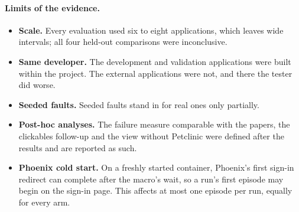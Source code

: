 \paragraph{Limits of the evidence.}
\begin{itemize}
  \item \textbf{Scale.} Every evaluation used six to eight applications, which leaves wide
        intervals; all four held-out comparisons were inconclusive.
  \item \textbf{Same developer.} The development and validation applications were built
        within the project. The external applications were not, and there the tester did
        worse.
  \item \textbf{Seeded faults.} Seeded faults stand in for real ones only
        partially.
  \item \textbf{Post-hoc analyses.} The failure measure comparable with the papers, the
        clickables follow-up and the view without Petclinic were defined after the results
        and are reported as such.
  \item \textbf{Phoenix cold start.} On a freshly started container, Phoenix's first sign-in
        redirect can complete after the macro's wait, so a run's first episode may begin on
        the sign-in page. This affects at most one episode per run, equally for every arm.
\end{itemize}
